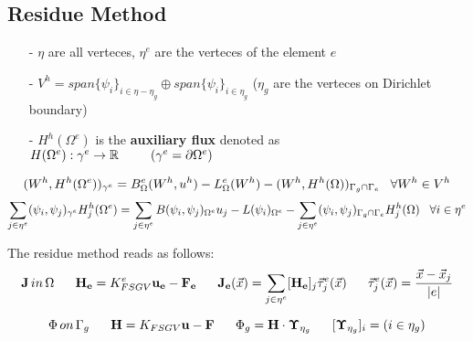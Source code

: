 \subsection{Residue Method}

\begin{itemize}
\item[-] $\eta$ are all verteces, $\eta^e$ are the verteces of the element $e$
\item[-] $V^h=span\{\psi_i\}_{i\in \eta-\eta_g}\oplus span\{\psi_i\}_{i\in \eta_g}$  ($\eta_g$ are the verteces on Dirichlet boundary)
\item[-] $H^h(\Omega^e)$ is the \textbf{auxiliary flux} denoted as $H(\Omega^e):\gamma^e\rightarrow\mathbb{R} \psp{15}(\gamma^e=\partial \Omega^e)$
\end{itemize}

\begin{equation*}
(W^h,H^h(\Omega^e))_{\gamma^e}=B_\Omega^e(W^h,u^h)-L_\Omega^e(W^h)-(W^h,H^h(\Omega))_{\Gamma_g\cap\Gamma_e} \psp{5} \forall W^h\in V^h
\end{equation*}
\begin{equation*}
\sum_{j\in \eta^e} (\psi_i,\psi_j)_{\gamma^e}H^h_j(\Omega^e)=\sum_{j\in \eta^e}B(\psi_i,\psi_j)_{\Omega^e}u_j-L(\psi_i)_{\Omega^e}-\sum_{j\in \eta^e}(\psi_i,\psi_j)_{\Gamma_g\cap\Gamma_e}H_j^h(\Omega) \psp{5} \forall i \in \eta^e
\end{equation*}

The residue method reads as follows:
$$\vect{J} \, in  \, \Omega \psp{10}
\vect{H_e} = K_{FSGV}^e \vect{u_e} - \vect{F_e} 
\psp{10}
\vect{J_e}(\vec{x}) = \sum_{j\in \eta^e}[\vect{H_e}]_j\vec{\tau}_j^e(\vec{x})
\psp{10}
\vec{\tau}_j^e(\vec{x})=\dfrac{\vec{x}-\vec{x}_j}{|e|}$$

$$\Phi \, on  \, \Gamma_g 
\psp{10}
\vect{H} = K_{FSGV} \vect{u} - \vect{F} 
\psp{10}
\Phi_g = \vect{H} \cdot \vect{\Upsilon}_{\eta_g}
\psp{10}
[\vect{\Upsilon}_{\eta_g}]_i=(i\in \eta_g) $$